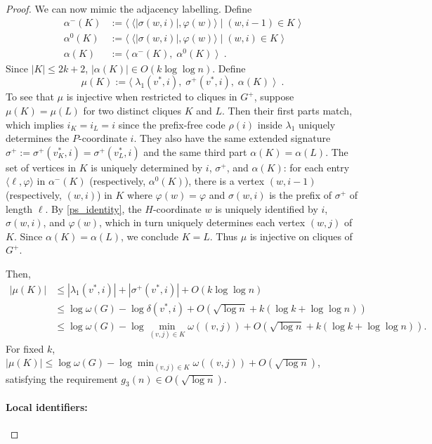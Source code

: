 \documentclass[twoside,leqno]{article}
\let\eqref\cref
\renewcommand{\le}{\leqslant}
\newcommand{\Oh}{O}
\begin{document}
\begin{proof}
    We can now mimic the adjacency labelling.  Define
    \begin{align*}
      \alpha^-(K)
       & := \langle\; \langle |\sigma(w,i)|, \varphi(w)\rangle \mid (w,i-1)\in K \;\rangle \\
      \alpha^0(K)
       & := \langle\; \langle |\sigma(w,i)|, \varphi(w)\rangle \mid (w,i)\in K \;\rangle   \\
      \alpha(K)
       & := \langle\; \alpha^-(K),\; \alpha^0(K)  \;\rangle \enspace .
    \end{align*}
    Since $|K|\le 2k+2$, $|\alpha(K)|\in\Oh(k\log\log n)$.  Define
    \[
      \mu(K) := \langle\; \lambda_1(v^*,i),\; \sigma^+(v^*,i),\; \alpha(K) \;\rangle \enspace .
    \]
    To see that $\mu$ is injective when restricted to cliques in $G^+$, suppose $\mu(K)=\mu(L)$ for two distinct cliques $K$ and $L$.
    Then their first parts match, which implies $i_K=i_L=i$ since the prefix-free code $\rho(i)$ inside $\lambda_1$ uniquely determines the $P$-coordinate $i$.
    They also have the same extended signature $\sigma^+:=\sigma^+(v^*_K,i)=\sigma^+(v^*_L,i)$ and the same third part $\alpha(K)=\alpha(L)$.
    The set of vertices in $K$ is uniquely determined by $i$, $\sigma^+$, and $\alpha(K)$: for each entry $\langle \ell, \varphi \rangle$ in $\alpha^-(K)$ (respectively, $\alpha^0(K)$), there is a vertex $(w,i-1)$ (respectively, $(w,i)$) in $K$ where $\varphi(w)=\varphi$ and $\sigma(w,i)$ is the prefix of $\sigma^+$ of length $\ell$.
    By \eqref{ps_identity}, the $H$-coordinate $w$ is uniquely identified by $i$, $\sigma(w,i)$, and $\varphi(w)$, which in turn uniquely determines each vertex $(w,j)$ of $K$.
    Since $\alpha(K)=\alpha(L)$, we conclude $K=L$. Thus $\mu$ is injective on cliques of $G^+$.

    Then,
    \begin{align*}
      |\mu(K)|
       & \le |\lambda_1(v^*,i)| + |\sigma^+(v^*,i)| + \Oh(k \log\log n)                                       \\
       & \le \log\omega(G) - \log\delta(v^*,i) + \Oh(\sqrt{\log n} + k(\log k+\log\log n))                    \\
       & \le \log\omega(G) - \log\min_{(v,j)\in K}\omega((v,j)) + \Oh(\sqrt{\log n} + k(\log k+\log\log n)) .
    \end{align*}
    For fixed $k$, $|\mu(K)|\le \log\omega(G) - \log\min_{(v,j)\in K}\omega((v,j)) + \Oh(\sqrt{\log n})$, satisfying the requirement $g_3(n)\in\Oh(\sqrt{\log n})$.

    \paragraph{Local identifiers:}


\end{proof}
\end{document}

